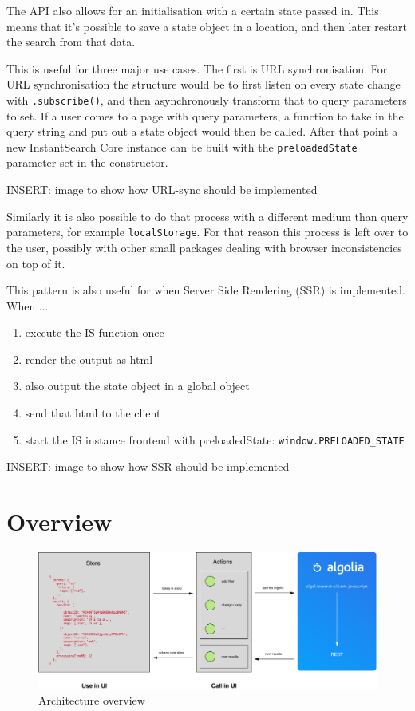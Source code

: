 The API also allows for an initialisation with a certain state passed in. This means that it's possible to save a state object in a location, and then later restart the search from that data. 

This is useful for three major use cases. The first is URL synchronisation. For URL synchronisation the structure would be to first listen on every state change with {\tt .subscribe()}, and then asynchronously transform that to query parameters to set. If a user comes to a page with query parameters, a function to take in the query string and put out a state object would then be called. After that point a new InstantSearch Core instance can be built with the {\tt preloadedState} parameter set in the constructor.

INSERT: image to show how URL-sync should be implemented %

Similarly it is also possible to do that process with a different medium than query parameters, for example {\tt localStorage}. For that reason this process is left over to the user, possibly with other small packages dealing with browser inconsistencies on top of it. 

This pattern is also useful for when Server Side Rendering (SSR) is implemented. When ...%

\begin{enumerate}
  \item execute the IS function once
  \item render the output as html
  \item also output the state object in a global object
  \item send that html to the client
  \item start the IS instance frontend with preloadedState: {\tt window.PRELOADED\_STATE} %
\end{enumerate}

INSERT: image to show how SSR should be implemented %


\section{Overview} %
\label{sec:overview}

\begin{figure}[H]
\label{figure:core-architecture}
  \centering
  \includegraphics[width=\textwidth]{../assets/architecture.pdf}
  \caption{Architecture overview\cite{blog-architecture}}
\end{figure}

